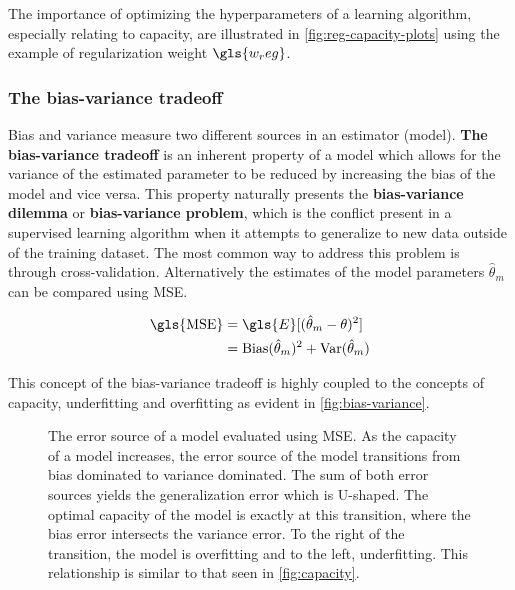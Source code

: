 The importance of optimizing the hyperparameters of a learning algorithm,
especially relating to capacity, are illustrated in
\autoref{fig:reg-capacity-plots} using the example of regularization weight
$\gls{w_reg}$.

\subsubsection{The bias-variance tradeoff}
Bias and variance measure two different sources in an estimator (model).
\textbf{The bias-variance tradeoff} is an inherent property of a model which
allows for the variance of the estimated parameter to be reduced by increasing
the bias of the model and vice versa. This property naturally presents the
\textbf{bias-variance dilemma} or \textbf{bias-variance problem}, which is the
conflict present in a supervised learning algorithm when it attempts to
generalize to new data outside of the training dataset. The most common way to
address this problem is through cross-validation. Alternatively the estimates
of the model parameters $\hat{\theta}_m$ can be compared using \gls{MSE}.

\begin{equation}
    \begin{aligned}
    \text{\gls{MSE}}&=\gls{E}[(\hat{\theta}_m-\theta)^2]\\
                    &=\text{Bias}(\hat{\theta}_m)^2+\text{Var}(\hat{\theta}_m)
    \end{aligned}
\end{equation}

This concept of the bias-variance tradeoff is highly coupled to the concepts of
capacity, underfitting and overfitting as evident in
\autoref{fig:bias-variance}.

\begin{figure}[htp!]
    \centering
    
    \captionsetup{format=hang} %
    \caption{
        The error source of a model evaluated using \gls{MSE}. As the capacity of
        a model increases, the error source of the model transitions from bias
        dominated to variance dominated. The sum of both error sources yields
        the generalization error which is U-shaped. The optimal capacity of the
        model is exactly at this transition, where the bias error intersects the
        variance error. To the right of the transition, the model is overfitting
        and to the left, underfitting. This relationship is similar to that seen
        in \autoref{fig:capacity}.
    }
    \label{fig:bias-variance}
\end{figure}

